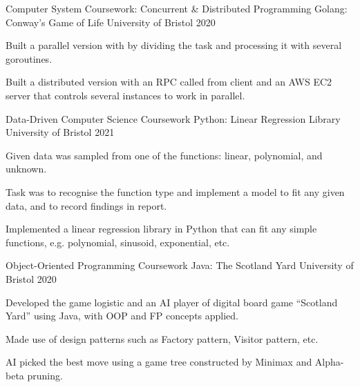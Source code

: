 

\begin{cventries}

  \cventry
    {Computer System Coursework: Concurrent \& Distributed Programming} %
    {Golang: Conway's Game of Life} %
    {University of Bristol} %
    {2020} %
    {
      \begin{cvitems} %
        \item {Built a parallel version with by dividing the task and processing it with several goroutines.}
        \item {Built a distributed version with an RPC called from client and an AWS EC2 server that controls several instances to work in parallel.}
      \end{cvitems}
    }

  \cventry
    {Data-Driven Computer Science Coursework} %
    {Python: Linear Regression Library} %
    {University of Bristol} %
    {2021} %
    {
      \begin{cvitems} %
        \item {Given data was sampled from one of the functions: linear, polynomial, and unknown.}
        \item {Task was to recognise the function type and implement a model to fit any given data, and to record findings in report.}
        \item {Implemented a linear regression library in Python that can fit any simple functions, e.g. polynomial, sinusoid, exponential, etc.}
      \end{cvitems}
    }

  \cventry
    {Object-Oriented Programming Coursework} %
    {Java: The Scotland Yard} %
    {University of Bristol} %
    {2020} %
    {
      \begin{cvitems} %
        \item {Developed the game logistic and an AI player of digital board game “Scotland Yard” using Java, with OOP and FP concepts applied.}
        \item {Made use of design patterns such as Factory pattern, Visitor pattern, etc.}
        \item {AI picked the best move using a game tree constructed by Minimax and Alpha-beta pruning.}
      \end{cvitems}
    }


\end{cventries}

